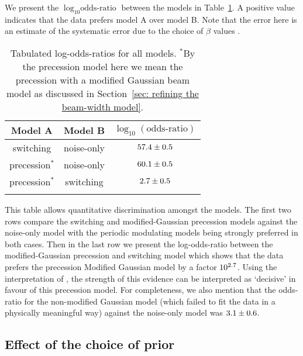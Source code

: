 \documentclass[../full_thesis/full_thesis.tex]{subfiles}
\begin{document}
We present the $\log_{10}\textrm{odds-ratio}$ between the models in
Table~\ref{tab: log odds-ratio}. A positive value indicates
that the data prefers model A over model B.
Note that the error here is an estimate of the systematic error due to the
choice of $\beta$ values \citep[see][for details]{Foreman-Mackay2013}.
\begin{table}[htb]
\small
\caption{Tabulated log-odds-ratios for all models. $^{*}$By the precession
model here we mean the precession with a modified Gaussian beam model as
discussed in Section~\ref{sec: refining the beam-width model}.}
\label{tab: log odds-ratio}
\begin{tabular}{ccc}\hhline{===}
Model A & Model B & $\log_{10}(\textrm{odds-ratio})$ \\ \hline
switching & noise-only &
$57.4 \pm 0.5$ \\
precession$^{*}$ & noise-only &
$60.1 \pm 0.5 $ \\
precession$^{*}$ & switching &
$2.7 \pm 0.5 $ \\
\hhline{===}
\end{tabular}
\end{table}

This table allows quantitative discrimination amongst the models. The first two
rows compare the switching and modified-Gaussian precession models against the
noise-only model with the periodic modulating models being strongly preferred
in both cases. Then in the last row we present the log-odds-ratio between the
modified-Gaussian precession and switching model which shows that the data
prefers the precession Modified Gaussian model by a factor
$10^{2.7}$. Using the interpretation
of \citet{jeffreys1998theory}, the strength of this evidence can be interpreted
as `decisive' in favour of this precession model. For completeness, we also
mention that the odds-ratio for the non-modified Gaussian model (which failed
to fit the data in a physically meaningful way) against the noise-only model
was $3.1 \pm
0.6$.

\subsection{Effect of the choice of prior}
\label{sec: effect of the choice of prior}
\end{document}
